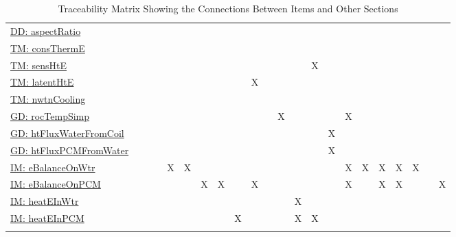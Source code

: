 \documentclass[12pt]{article}
\begin{document}
\begin{longtable}{l l l l l l l l l l l l l l l l l l l l l l}
\\
\hyperref[DD:aspectRatio]{DD: aspectRatio} &  &  &  &  &  &  &  &  &  &  &  &  &  &  &  &  &  &  &  &  & 
\\
\hyperref[TM:consThermE]{TM: consThermE} &  &  &  &  &  &  &  &  &  &  &  &  &  &  &  &  &  &  &  &  & 
\\
\hyperref[TM:sensHtE]{TM: sensHtE} &  &  &  &  &  &  &  &  &  &  &  &  & X &  &  &  &  &  &  &  & 
\\
\hyperref[TM:latentHtE]{TM: latentHtE} &  &  &  &  &  &  &  &  & X &  &  &  &  &  &  &  &  &  &  &  & 
\\
\hyperref[TM:nwtnCooling]{TM: nwtnCooling} &  &  &  &  &  &  &  &  &  &  &  &  &  &  &  &  &  &  &  &  & 
\\
\hyperref[GD:rocTempSimp]{GD: rocTempSimp} &  &  &  &  &  &  &  &  &  &  & X &  &  &  & X &  &  &  &  &  & 
\\
\hyperref[GD:htFluxWaterFromCoil]{GD: htFluxWaterFromCoil} &  &  &  &  &  &  &  &  &  &  &  &  &  & X &  &  &  &  &  &  & 
\\
\hyperref[GD:htFluxPCMFromWater]{GD: htFluxPCMFromWater} &  &  &  &  &  &  &  &  &  &  &  &  &  & X &  &  &  &  &  &  & 
\\
\hyperref[IM:eBalanceOnWtr]{IM: eBalanceOnWtr} &  &  &  & X & X &  &  &  &  &  &  &  &  &  & X & X & X & X & X &  & 
\\
\hyperref[IM:eBalanceOnPCM]{IM: eBalanceOnPCM} &  &  &  &  &  & X & X &  & X &  &  &  &  &  & X &  & X & X &  &  & X
\\
\hyperref[IM:heatEInWtr]{IM: heatEInWtr} &  &  &  &  &  &  &  &  &  &  &  & X &  &  &  &  &  &  &  &  & 
\\
\hyperref[IM:heatEInPCM]{IM: heatEInPCM} &  &  &  &  &  &  &  & X &  &  &  & X & X &  &  &  &  &  &  &  & 
\\
\bottomrule
\caption{Traceability Matrix Showing the Connections Between Items and Other Sections}
\label{Table:TraceMatRefvsRef}
\end{longtable}
\end{document}
